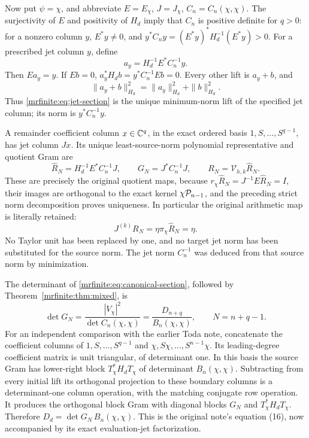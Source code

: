 \documentclass[11pt]{article}
\begin{document}
Now put \(\psi=\chi\), and abbreviate
\(E=E_\chi\), \(J=J_\chi\), \(C_n=C_n(\chi,\chi)\).
The surjectivity of \(E\) and positivity of \(H_d\) imply that \(C_n\)
is positive definite for \(q>0\): for a nonzero column \(y\),
\(E^*y\ne0\), and \(y^*C_ny=(E^*y)^*H_d^{-1}(E^*y)>0\).
For a prescribed jet column \(y\), define
\begin{equation}\label{mrfinite:eq:jet-section}
 a_y=H_d^{-1}E^*C_n^{-1}y.
\end{equation}
Then \(Ea_y=y\). If \(Eb=0\),
\(a_y^*H_db=y^*C_n^{-1}Eb=0\). Every other lift is \(a_y+b\), and
\[
 \|a_y+b\|_{H_d}^2=\|a_y\|_{H_d}^2+\|b\|_{H_d}^2.
\]
Thus \eqref{mrfinite:eq:jet-section} is the unique minimum-norm lift of the
specified jet column; its norm is \(y^*C_n^{-1}y\).

A remainder coefficient column \(x\in\mathbb C^q\), in the exact ordered basis
\(1,S,\ldots,S^{q-1}\), has jet column \(Jx\). Its unique
least-source-norm polynomial representative and quotient Gram are
\begin{equation}\label{mrfinite:eq:canonical-section}
 \widehat R_N=H_d^{-1}E^*C_n^{-1}J,\qquad
 G_N=J^*C_n^{-1}J,\qquad R_N=\mathcal V_{h,k}\widehat R_N.
\end{equation}
These are precisely the original quotient maps, because
\(r_\chi\widehat R_N=J^{-1}E\widehat R_N=I\), their images are
orthogonal to the exact kernel \(\chi\mathcal P_{n-1}\), and the preceding
strict norm decomposition proves uniqueness. In particular the
original arithmetic map is literally retained:
\[
 J^{(k)}R_N=\eta\pi_\chi\widehat R_N=\eta.
\]
No Taylor unit has been replaced by one, and no target jet norm has been
substituted for the source norm. The jet norm \(C_n^{-1}\) was deduced
from that source norm by minimization.

The determinant of \eqref{mrfinite:eq:canonical-section}, followed by
Theorem~\ref{mrfinite:thm:mixed}, is
\begin{equation}\label{mrfinite:eq:quotientdet}
 \boxed{\det G_N=\frac{|V_\chi|^2}{\det C_n(\chi,\chi)}
              =\frac{D_{n+q}}{B_n(\chi,\chi)},
       \qquad N=n+q-1.}
\end{equation}
For an independent comparison with the earlier Toda note, concatenate
the coefficient columns of
\(1,S,\ldots,S^{q-1}\) and
\(\chi,S\chi,\ldots,S^{n-1}\chi\).
Its leading-degree coefficient matrix is unit triangular, of determinant
one. In this basis the source Gram has lower-right block
\(T_\chi^*H_dT_\chi\) of determinant \(B_n(\chi,\chi)\).
Subtracting from every initial lift its orthogonal projection to these
boundary columns is a determinant-one column operation, with the
matching conjugate row operation. It produces the orthogonal block Gram
with diagonal blocks \(G_N\) and \(T_\chi^*H_dT_\chi\).
Therefore \(D_d=\det G_N\,B_n(\chi,\chi)\).
This is the original note's equation (16), now accompanied by its exact
evaluation-jet factorization.
\end{document}
